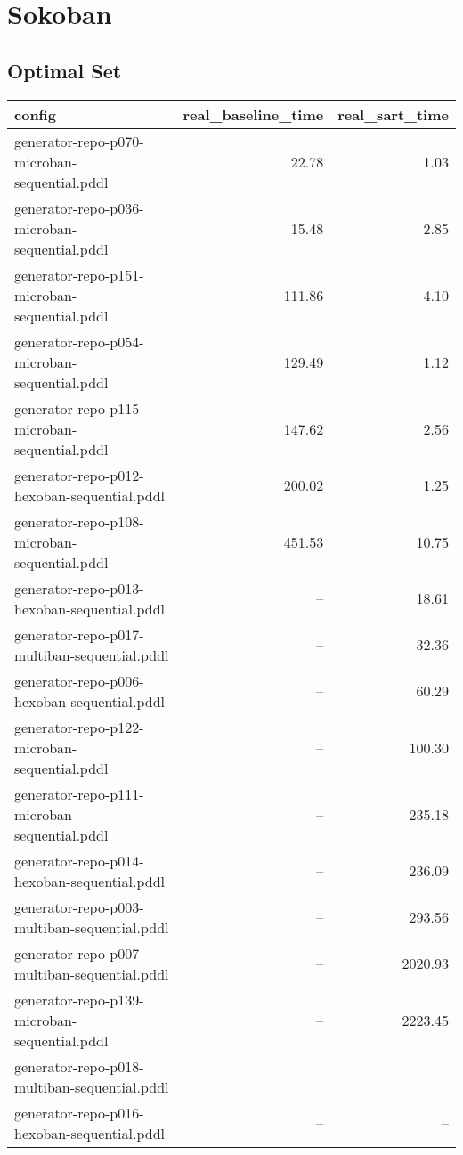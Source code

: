 \documentclass{article}
\begin{document}
                \newpage \section{Sokoban}
                    \subsection*{Optimal Set}
                    
                            \begin{center}
                            \scriptsize
                            \begin{tabular}{@{}l|r|r@{}}
                            config & real\_baseline\_time & real\_sart\_time\\\midrule
                             generator-repo-p070-microban-sequential.pddl&22.78&1.03\\
 generator-repo-p036-microban-sequential.pddl&15.48&2.85\\
 generator-repo-p151-microban-sequential.pddl&111.86&4.10\\
 generator-repo-p054-microban-sequential.pddl&129.49&1.12\\
 generator-repo-p115-microban-sequential.pddl&147.62&2.56\\
 generator-repo-p012-hexoban-sequential.pddl&200.02&1.25\\
 generator-repo-p108-microban-sequential.pddl&451.53&10.75\\
 generator-repo-p013-hexoban-sequential.pddl&--&18.61\\
 generator-repo-p017-multiban-sequential.pddl&--&32.36\\
 generator-repo-p006-hexoban-sequential.pddl&--&60.29\\
 generator-repo-p122-microban-sequential.pddl&--&100.30\\
 generator-repo-p111-microban-sequential.pddl&--&235.18\\
 generator-repo-p014-hexoban-sequential.pddl&--&236.09\\
 generator-repo-p003-multiban-sequential.pddl&--&293.56\\
 generator-repo-p007-multiban-sequential.pddl&--&2020.93\\
 generator-repo-p139-microban-sequential.pddl&--&2223.45\\
 generator-repo-p018-multiban-sequential.pddl&--&--\\
 generator-repo-p016-hexoban-sequential.pddl&--&--\\

\end{tabular}
\end{center}
\end{document}
